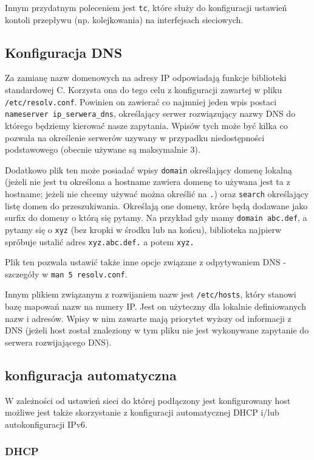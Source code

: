 Innym przydatnym poleceniem jest \Verb#tc#, które służy do konfiguracji ustawień kontoli przepływu (np. kolejkowania) na interfejsach sieciowych. 


\subsection{Konfiguracja DNS}

Za zamianę nazw domenowych na adresy IP odpowiadają funkcje biblioteki standardowej C. Korzysta ona do tego celu z konfiguracji zawartej w pliku \Verb#/etc/resolv.conf#.
Powinien on zawierać co najmniej jeden wpis postaci \Verb#nameserver ip_serwera_dns#, określający serwer rozwiązujący nazwy DNS do którego będziemy kierować nasze zapytania.
Wpisów tych może być kilka co pozwala na określenie serwerów uzywany w przypadku niedostępności podstawowego (obecnie używane są maksymalnie 3).

Dodatkowo plik ten może posiadać wpisy
	\Verb#domain# określający domenę lokalną (jeżeli nie jest tu określona a hostname zawiera domenę to używana jest ta z hostname; jeżeli nie chcemy używać można określić na \Verb#.#) oraz
	\Verb#search# określający listę domen do przeszukiwania.
Określają one domeny, króre będą dodawane jako surfix do domeny o którą się pytamy. Na przykład gdy mamy \Verb#domain abc.def#, a pytamy się o \Verb#xyz# (bez kropki w środku lub na końcu), biblioteka najpierw spróbuje ustalić adres \Verb#xyz.abc.def.# a potem \Verb#xyz.#

Plik ten pozwala ustawić także inne opcje związane z odpytywaniem DNS - szczegóły w \Verb#man 5 resolv.conf#.

Innym plikiem związanym z rozwijaniem nazw jest \Verb#/etc/hosts#, który stanowi bazę mapowań nazw na numery IP.
Jest on użyteczny dla lokalnie definiowanych nazw i adresów.
Wpisy w nim zawarte mają priorytet wyższy od informacji z DNS (jeżeli host został znaleziony w tym pliku nie jest wykonywane zapytanie do serwera rozwijającego DNS).


\subsection{konfiguracja automatyczna}

W zależności od ustawień sieci do której podłączony jest konfigurowany host możliwe jest także skorzystanie z konfiguracji automatycznej DHCP i/lub autokonfiguracji IPv6.

\subsubsection{DHCP}


